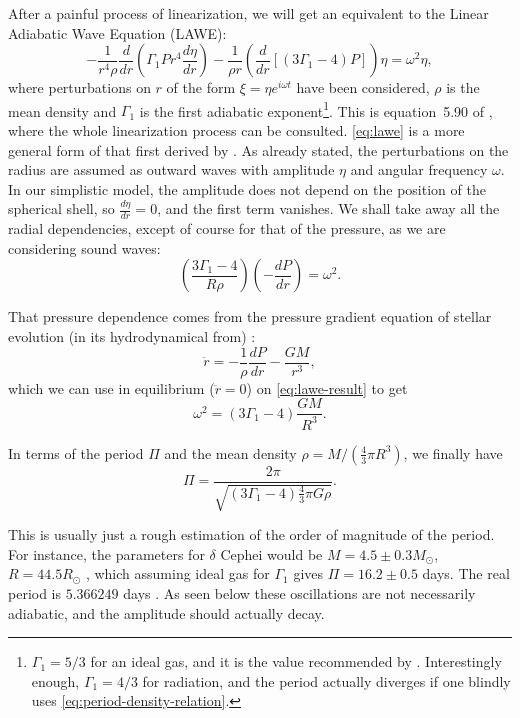 	After a painful process of linearization, we will get an equivalent to the Linear Adiabatic Wave Equation (LAWE):
	\begin{equation}
		-\frac{1}{r^4 \rho} \frac{d}{dr}\left(\Gamma_1P r^4 \frac{d\eta}{dr}\right) - \frac{1}{\rho r}\left(\frac{d}{dr}\left[\left(3\Gamma_1-4\right)P\right]\right)\eta = \omega^2 \eta, \label{eq:lawe}
	\end{equation}
	where perturbations on $r$ of the form $\xi = \eta e^{i\omega t}$ have been considered, $\rho$ is the mean density and $\Gamma_1$ is the first adiabatic exponent\footnote{
		$\Gamma_1=5/3$ for an ideal gas, and it is the value recommended by \cite{Cox1980}. 
		Interestingly enough, $\Gamma_1=4/3$ for radiation, and the period actually diverges if one blindly uses \autoref{eq:period-density-relation}.
	}. This is equation~5.90 of \cite{Catelan2015}, where the whole linearization process can be consulted.
	\autoref{eq:lawe} is a more general form of that first derived by \cite{Eddington1918}.
	As already stated, the perturbations on the radius are assumed as outward waves with amplitude $\eta$ and angular frequency $\omega$.
	In our simplistic model, the amplitude does not depend on the position of the spherical shell, so $\frac{d\eta}{dr}=0$, and the first term vanishes.
	We shall take away all the radial dependencies, except of course for that of the pressure, as we are considering sound waves:
	\begin{equation}
		\left(\frac{3 \Gamma_1-4}{R\rho}\right)\left(-\frac{dP}{dr}\right) = \omega^2. \label{eq:lawe-result}
	\end{equation}
	
	That pressure dependence comes from the pressure gradient equation of stellar evolution (in its hydrodynamical from) \cite[equation 4.18]{Catelan2015}:
	\begin{equation}
		\ddot{r} = -\frac{1}{\rho} \frac{d P}{d r}-\frac{GM}{r^3},
	\end{equation}
	which we can use in equilibrium ($\ddot{r}=0$) on \autoref{eq:lawe-result} to get
	$$
	\omega^2 = (3\Gamma_1-4)\frac{GM}{R^3}.
	$$
	
	In terms of the period $\Pi$ and the mean density $\rho=M/(\frac{4}{3}\pi R^3)$, we finally have
	\begin{equation}
		\Pi = \frac{2\pi}{\sqrt{(3\Gamma_1-4)\frac{4}{3}\pi G \rho}}. \label{eq:period-density-relation}
	\end{equation}
	
	This is usually just a rough estimation of the order of magnitude of the period. 
	For instance, the parameters for $\delta$ Cephei would be $M=4.5\pm0.3 M_\odot$, $R=44.5R_\odot$ \citep{Matthews2012},
	which assuming ideal gas for $\Gamma_1$ gives $\Pi=16.2\pm0.5$ days. 
	The real period is $5.366249$ days \citep{Samus2017}.
	As seen below these oscillations are not necessarily adiabatic, and the amplitude should actually decay.
	


